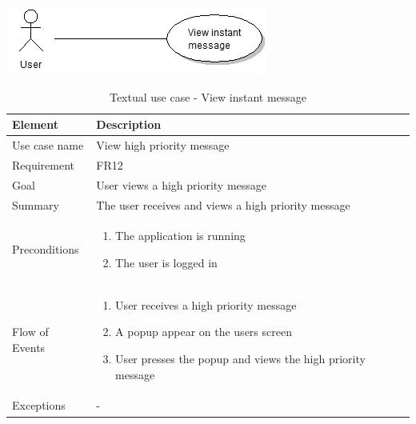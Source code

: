 \begin{table}
\begin{center}
\begin{center}
\includegraphics[width=\textwidth]{view_instant_message}
\end{center}
\begin{tabular}{p{3cm}|p{12cm}} \hline
Element & Description \\ \hline \hline
Use case name & View high priority message \\
Requirement & FR12 \\
Goal & User views a high priority message \\
Summary & The user receives and views a high priority message \\ \hline
Preconditions &
\begin{enumerate}
\item{}The application is running
\item{}The user is logged in
\end{enumerate} \\ \hline
Flow of Events &
\begin{enumerate}
\item{}User receives a high priority message
\item{}A popup appear on the users screen
\item{}User presses the popup and views the high priority message
\end{enumerate} \\ \hline
Exceptions & - \\ \hline
\end{tabular}
\end{center}
\caption{Textual use case - View instant message} \label{tab:createmessage}
\end{table}

